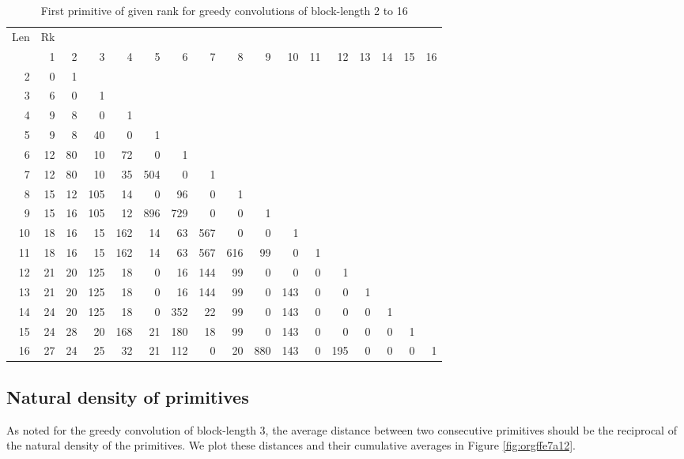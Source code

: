 \documentclass[12pt]{article}
\theoremstyle{definition}
\theoremstyle{remark}
\theoremstyle{plain}
\begin{document}
\begin{table}[ptbh]
\caption{\label{tab:orgfb58e13}First primitive of given rank for greedy convolutions of block-length 2 to 16}
\centering
\begin{tabular}{rrrrrrrrrrrrrrrrr}
Len & Rk &  &  &  &  &  &  &  &  &  &  &  &  &  &  & \\
 & 1 & 2 & 3 & 4 & 5 & 6 & 7 & 8 & 9 & 10 & 11 & 12 & 13 & 14 & 15 & 16\\
2 & 0 & 1 &  &  &  &  &  &  &  &  &  &  &  &  &  & \\
3 & 6 & 0 & 1 &  &  &  &  &  &  &  &  &  &  &  &  & \\
4 & 9 & 8 & 0 & 1 &  &  &  &  &  &  &  &  &  &  &  & \\
5 & 9 & 8 & 40 & 0 & 1 &  &  &  &  &  &  &  &  &  &  & \\
6 & 12 & 80 & 10 & 72 & 0 & 1 &  &  &  &  &  &  &  &  &  & \\
7 & 12 & 80 & 10 & 35 & 504 & 0 & 1 &  &  &  &  &  &  &  &  & \\
8 & 15 & 12 & 105 & 14 & 0 & 96 & 0 & 1 &  &  &  &  &  &  &  & \\
9 & 15 & 16 & 105 & 12 & 896 & 729 & 0 & 0 & 1 &  &  &  &  &  &  & \\
10 & 18 & 16 & 15 & 162 & 14 & 63 & 567 & 0 & 0 & 1 &  &  &  &  &  & \\
11 & 18 & 16 & 15 & 162 & 14 & 63 & 567 & 616 & 99 & 0 & 1 &  &  &  &  & \\
12 & 21 & 20 & 125 & 18 & 0 & 16 & 144 & 99 & 0 & 0 & 0 & 1 &  &  &  & \\
13 & 21 & 20 & 125 & 18 & 0 & 16 & 144 & 99 & 0 & 143 & 0 & 0 & 1 &  &  & \\
14 & 24 & 20 & 125 & 18 & 0 & 352 & 22 & 99 & 0 & 143 & 0 & 0 & 0 & 1 &  & \\
15 & 24 & 28 & 20 & 168 & 21 & 180 & 18 & 99 & 0 & 143 & 0 & 0 & 0 & 0 & 1 & \\
16 & 27 & 24 & 25 & 32 & 21 & 112 & 0 & 20 & 880 & 143 & 0 & 195 & 0 & 0 & 0 & 1\\
\end{tabular}
\end{table}
\subsection{Natural density of primitives}
\label{sec:org900c641}
As noted for the greedy convolution of block-length 3, the average distance between two consecutive primitives
should be the reciprocal of the natural density of the primitives. We plot these distances and their cumulative averages
in Figure \ref{fig:orgffe7a12}.
\end{document}
